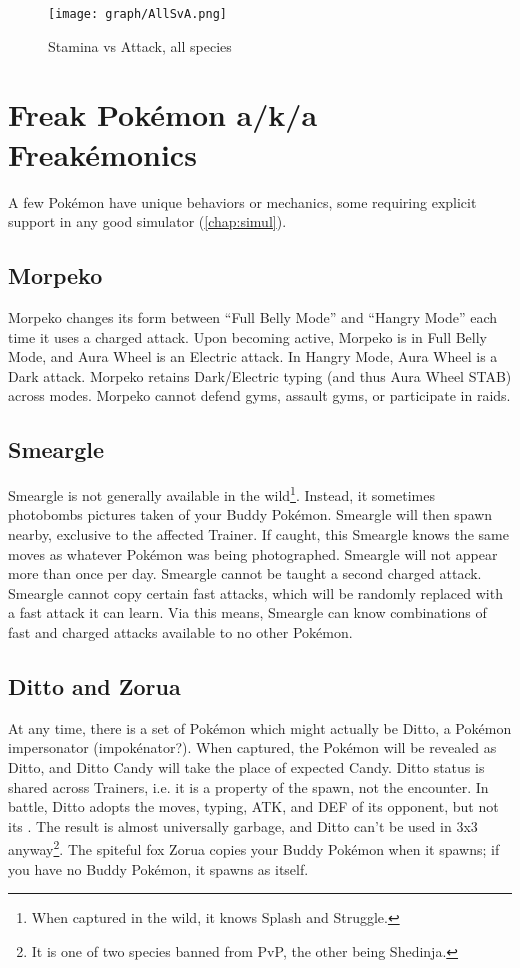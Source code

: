 \begin{figure}[hb]
\centering
\texttt{[image: graph/AllSvA.png]}
  \caption{Stamina vs Attack, all species\label{figure:allsva}}
\end{figure}

\section{Freak Pokémon a/k/a Freakémonics\label{sec:freaks}}
A few Pokémon have unique behaviors or mechanics, some requiring explicit
  support in any good simulator (\autoref{chap:simul}).

\subsection{Morpeko\label{subsec:morpeko}}
Morpeko changes its form between ``Full Belly Mode'' and ``Hangry Mode''
  each time it uses a charged attack.
Upon becoming active, Morpeko is in Full Belly Mode, and Aura Wheel is an Electric attack.
In Hangry Mode, Aura Wheel is a Dark attack.
Morpeko retains Dark/Electric typing (and thus Aura Wheel STAB) across modes.
Morpeko cannot defend gyms, assault gyms, or participate in raids.

\subsection{Smeargle\label{subsec:smeargle}}
Smeargle is not generally available in the wild\footnote{When captured in the wild, it knows Splash and Struggle.}.
Instead, it sometimes photobombs pictures taken of your Buddy Pokémon.
Smeargle will then spawn nearby, exclusive to the affected Trainer.
If caught, this Smeargle knows the same moves as whatever Pokémon was being photographed.
Smeargle will not appear more than once per day.
Smeargle cannot be taught a second charged attack.
Smeargle cannot copy certain fast attacks, which will be randomly replaced with
 a fast attack it can learn.
Via this means, Smeargle can know combinations of fast and charged attacks available
 to no other Pokémon.

\subsection{Ditto and Zorua\label{subsec:ditto}}
At any time, there is a set of Pokémon which might actually be Ditto,
  a Pokémon impersonator (impokénator?).
When captured, the Pokémon will be revealed as Ditto, and Ditto Candy will take
  the place of expected Candy.
Ditto status is shared across Trainers, i.e. it is a property of the spawn, not the encounter.
In battle, Ditto adopts the moves, typing, ATK, and DEF of its opponent, but not its \MHP\@.
The result is almost universally garbage, and Ditto can't be used in 3x3 anyway\footnote{It is one of two species banned from PvP, the other being Shedinja.}.
The spiteful fox Zorua copies your Buddy Pokémon when it spawns; if you have no Buddy
  Pokémon, it spawns as itself.

